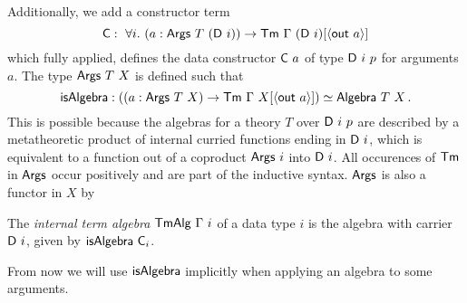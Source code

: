 Additionally, we add a constructor term
\[
	\mta{C} :\ \forall i.\ (a : \mta{Args}\ T\ (\mta{D}\ i)) \to \Tm\ \Gamma\ (\mta{D}\ i)[\Msub{\mta{out}\ a}] \\
\]
which fully applied, defines the data constructor $\textsf{C}\ a$ of type
$\textsf{D}\ i\ p$ for arguments $a$. The type $\textsf{Args}\ T\ X$ is defined such
that
\begin{equation}
	\textsf{isAlgebra} : ((a : \textsf{Args}\ T\ X) \to \textsf{Tm}\ \Gamma\ X[\langle\textsf{out}\ a\rangle]) \simeq \textsf{Algebra}\ T\ X \,.\label{eq:args-iso}
\end{equation}
This is possible because the algebras for a theory $T$ over $\textsf{D}\ i\ p$ are
described by a metatheoretic product of internal curried functions ending in
$\mta{D}\ i$, which is equivalent to a function out of a coproduct
$\mta{Args}\ i$ into $\mta{D}\ i$. All occurences of $\textsf{Tm}$ in
$\textsf{Args}$ occur positively and are part of the inductive syntax.
$\textsf{Args}$ is also a functor in $X$ by

\begin{definition}
	The \emph{internal term algebra} $\textsf{TmAlg}\ \Gamma\ i$ of a data type $i$ is
	the algebra with carrier $\mta{D}\ i$, given by $\mta{isAlgebra}\ \mta{C}_i$.
\end{definition}

From now we will use $\textsf{isAlgebra}$ implicitly when applying an algebra to
some arguments.

